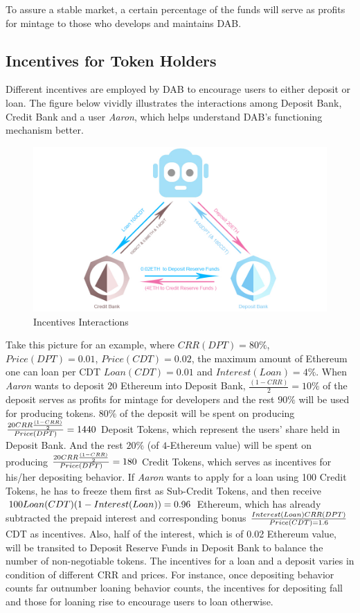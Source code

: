\documentclass[review]{elsarticle}
\begin{document}
To assure a stable market, a certain percentage of the funds will serve as profits for mintage to those who develops and maintains DAB.

\subsection{Incentives for Token Holders}
Different incentives are employed by DAB to encourage users to either deposit or loan. The figure below vividly illustrates the interactions among Deposit Bank, Credit Bank and a user \emph{Aaron}, which helps understand DAB's functioning mechanism better.

\begin{figure}[H]
\begin{center}
\includegraphics[width=4.5in]{Graphs/InterestDistribution.jpg}
\end{center}
\caption{Incentives Interactions}\label{TS}
\end{figure}

Take this picture for an example, where ${CRR(DPT) = 80\%}$, ${Price(DPT) = 0.01}$, ${Price(CDT) = 0.02}$,  the maximum amount of Ethereum one can loan per CDT ${Loan(CDT) = 0.01}$ and ${Interest(Loan) = 4\%}$. When \emph{Aaron} wants to deposit $20$ Ethereum into Deposit Bank, ${\frac{(1 - CRR)}{2} = 10\%}$ of the deposit serves as  profits for mintage for developers and the rest ${90\%}$ will be used for producing tokens. $80\%$ of the deposit will be spent on producing ${\frac{20 \* CRR \* \frac{(1 - CRR)}{2}}{Price(DPT)} = 1440}$ Deposit Tokens, which represent the users' share held in Deposit Bank. And the rest $20\%$ (of $4$-Ethereum value) will be spent on producing ${\frac{20 \* CRR \* \frac{(1 - CRR)}{2}}{Price(DPT)} = 180}$ Credit Tokens, which serves as incentives for his/her depositing behavior. If \emph{Aaron} wants to apply for a loan using 100 Credit Tokens, he has to freeze them first as Sub-Credit Tokens, and then receive ${100 \* Loan(CDT) \* (1 - Interest(Loan)) = 0.96}$ Ethereum, which has already subtracted the prepaid interest and corresponding bonus ${\frac{Interest(Loan) \* CRR(DPT)}{Price(CDT) = 1.6}}$ CDT as incentives. Also, half of the interest, which is of 0.02 Ethereum value, will be transited to Deposit Reserve Funds in Deposit Bank to balance the number of non-negotiable tokens.
The incentives for a loan and a deposit varies in condition of different CRR and prices. For instance, once depositing behavior counts far outnumber loaning behavior counts, the incentives for depositing fall and those for loaning rise to encourage users to loan otherwise.
\end{document}
